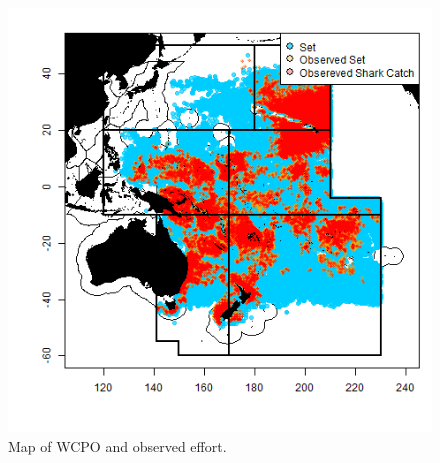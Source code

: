 \documentclass[12pt]{SCreport}
\begin{document}

\begin{figure}
\begin{center}
\includegraphics[scale=0.95]{../GRAPHICS/Defined/FIG_02_MAP_sets}
\caption{\label{fig:regions} Map of WCPO and observed effort.}
\end{center}
\end{figure}
\end{document}
